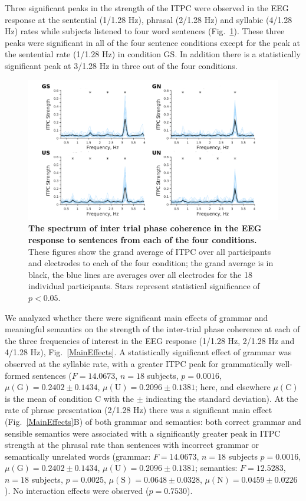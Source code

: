 \documentclass[a4paper,10pt,twoside]{article}
\begin{document}
Three significant peaks in the strength of the ITPC were observed in
the EEG response at the sentential (1/1.28 Hz), phrasal (2/1.28 Hz)
and syllabic (4/1.28 Hz) rates while subjects listened to four word
sentences (Fig.~\ref{Fig1}). These three peaks were significant in all
of the four sentence conditions except for the peak at the sentential
rate (1/1.28 Hz) in condition GS. In addition there is a
statistically significant peak at 3/1.28 Hz in three out of the four
conditions.

\begin{figure}[tbp]
\includegraphics[width=\linewidth]{ITPC_by_condition.png}
\caption{\textbf{The spectrum of inter trial phase coherence in the
    EEG response to sentences from each of the four conditions.} These
  figures show the grand average of ITPC over all participants and
  electrodes to each of the four condition; the grand average is in
  black, the blue lines are averages over all electrodes for the 18
  individual participants. Stars represent statistical significance of
  $p<0.05$.}
\label{Fig1}
\end{figure}

We analyzed whether there were significant main effects of grammar and
meaningful semantics on the strength of the inter-trial phase
coherence at each of the three frequencies of interest in the EEG
response (1/1.28 Hz, 2/1.28 Hz and 4/1.28 Hz),
Fig.~\ref{MainEffects}. A statistically significant effect of grammar
was observed at the syllabic rate, with a greater ITPC peak for
grammatically well-formed sentences ($F=14.0673$, $n=18$ subjects,
$p=0.0016$, $\mu(\mathrm{G}) = 0.2402 \pm 0.1434$, $\mu(\mathrm{U}) =
0.2096 \pm 0.1381$; here, and elsewhere $\mu(\mathrm{C})$ is the mean of
condition C with the $\pm$ indicating the standard deviation). At the
rate of phrase presentation (2/1.28 Hz) there was a significant main
effect (Fig.~\ref{MainEffects}B) of both grammar and semantics: both
correct grammar and sensible semantics were associated with a
significantly greater peak in ITPC strength at the phrasal rate than
sentences with incorrect grammar or semantically unrelated words
(grammar: $F=14.0673$, $n=18$ subjects $p=0.0016$, $\mu(\mathrm{G})=
0.2402 \pm 0.1434$, $\mu(\mathrm{U})= 0.2096 \pm 0.1381$; semantics:
 $F=12.5283$, $n=18$ subjects, $p=0.0025$, $\mu(\mathrm{S}) = 0.0648
\pm 0.0328$, $\mu(\mathrm{N}) = 0.0459 \pm 0.0226$). No interaction
effects were observed ($p=0.7530$).
\end{document}
